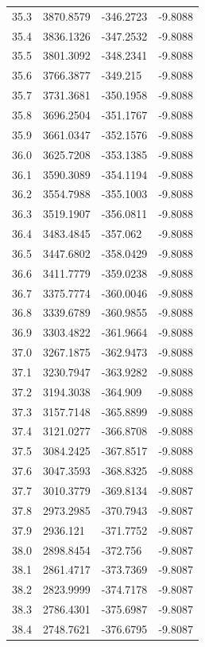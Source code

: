 \begin{table}[H]
\begin{tabular}{llll}
35.3 & 3870.8579 & -346.2723 & -9.8088 \\
35.4 & 3836.1326 & -347.2532 & -9.8088 \\
35.5 & 3801.3092 & -348.2341 & -9.8088 \\
35.6 & 3766.3877 & -349.215 & -9.8088 \\
35.7 & 3731.3681 & -350.1958 & -9.8088 \\
35.8 & 3696.2504 & -351.1767 & -9.8088 \\
35.9 & 3661.0347 & -352.1576 & -9.8088 \\
36.0 & 3625.7208 & -353.1385 & -9.8088 \\
36.1 & 3590.3089 & -354.1194 & -9.8088 \\
36.2 & 3554.7988 & -355.1003 & -9.8088 \\
36.3 & 3519.1907 & -356.0811 & -9.8088 \\
36.4 & 3483.4845 & -357.062 & -9.8088 \\
36.5 & 3447.6802 & -358.0429 & -9.8088 \\
36.6 & 3411.7779 & -359.0238 & -9.8088 \\
36.7 & 3375.7774 & -360.0046 & -9.8088 \\
36.8 & 3339.6789 & -360.9855 & -9.8088 \\
36.9 & 3303.4822 & -361.9664 & -9.8088 \\
37.0 & 3267.1875 & -362.9473 & -9.8088 \\
37.1 & 3230.7947 & -363.9282 & -9.8088 \\
37.2 & 3194.3038 & -364.909 & -9.8088 \\
37.3 & 3157.7148 & -365.8899 & -9.8088 \\
37.4 & 3121.0277 & -366.8708 & -9.8088 \\
37.5 & 3084.2425 & -367.8517 & -9.8088 \\
37.6 & 3047.3593 & -368.8325 & -9.8088 \\
37.7 & 3010.3779 & -369.8134 & -9.8087 \\
37.8 & 2973.2985 & -370.7943 & -9.8087 \\
37.9 & 2936.121 & -371.7752 & -9.8087 \\
38.0 & 2898.8454 & -372.756 & -9.8087 \\
38.1 & 2861.4717 & -373.7369 & -9.8087 \\
38.2 & 2823.9999 & -374.7178 & -9.8087 \\
38.3 & 2786.4301 & -375.6987 & -9.8087 \\
38.4 & 2748.7621 & -376.6795 & -9.8087 \\

\end{tabular}
\end{table}
